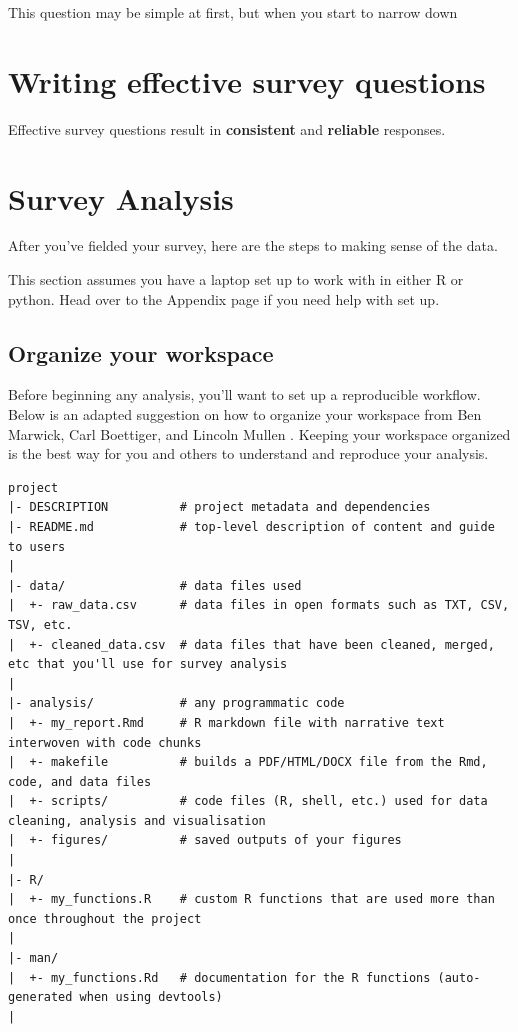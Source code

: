 \documentclass[]{book}
\begin{document}
This question may be simple at first, but when you start to narrow down

\hypertarget{writing-effective-survey-questions}{%
\chapter{Writing effective survey questions}\label{writing-effective-survey-questions}}

Effective survey questions result in \textbf{consistent} and \textbf{reliable} responses.

\hypertarget{analysis}{%
\chapter{Survey Analysis}\label{analysis}}

After you've fielded your survey, here are the steps to making sense of the data.

This section assumes you have a laptop set up to work with in either R or python. Head over to the Appendix page if you need help with set up.

\hypertarget{organize-your-workspace}{%
\section{Organize your workspace}\label{organize-your-workspace}}

Before beginning any analysis, you'll want to set up a reproducible workflow. Below is an adapted suggestion on how to organize your workspace from Ben Marwick, Carl Boettiger, and Lincoln Mullen \citep{reproducible_workflow}. Keeping your workspace organized is the best way for you and others to understand and reproduce your analysis.

\begin{verbatim}
project
|- DESCRIPTION          # project metadata and dependencies 
|- README.md            # top-level description of content and guide to users
|
|- data/                # data files used 
|  +- raw_data.csv      # data files in open formats such as TXT, CSV, TSV, etc.
|  +- cleaned_data.csv  # data files that have been cleaned, merged, etc that you'll use for survey analysis
|
|- analysis/            # any programmatic code
|  +- my_report.Rmd     # R markdown file with narrative text interwoven with code chunks 
|  +- makefile          # builds a PDF/HTML/DOCX file from the Rmd, code, and data files
|  +- scripts/          # code files (R, shell, etc.) used for data cleaning, analysis and visualisation
|  +- figures/          # saved outputs of your figures
|
|- R/                     
|  +- my_functions.R    # custom R functions that are used more than once throughout the project
|
|- man/
|  +- my_functions.Rd   # documentation for the R functions (auto-generated when using devtools)
|
\end{verbatim}
\end{document}
